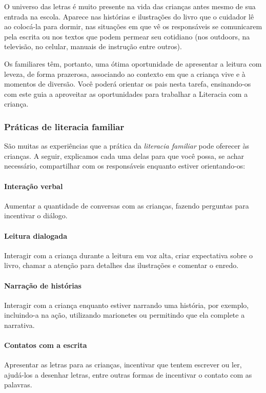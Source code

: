 \documentclass[11pt]{extarticle}
\begin{document}
O universo das letras é muito presente na vida das crianças antes mesmo de sua 
entrada na escola. Aparece nas histórias e ilustrações do livro que o cuidador 
lê ao colocá-la para dormir, nas situações em que vê os responsáveis se comunicarem 
pela escrita ou nos textos que podem permear seu cotidiano (nos outdoors, na 
televisão, no celular, manuais de instrução entre outros). 

Os familiares têm, 
portanto, uma ótima oportunidade de apresentar a leitura com leveza, de forma 
prazerosa, associando ao contexto em que a criança vive e à momentos de diversão. 
Você poderá orientar os pais nesta tarefa, ensinando-os com este guia a aproveitar 
as oportunidades para trabalhar a Literacia com a criança.

\subsubsection{Práticas de literacia familiar} 

São muitas as experiências que a prática da \textit{literacia familiar} 
pode oferecer às crianças. A seguir, explicamos cada uma delas para que você possa, 
se achar necessário, compartilhar com os responsáveis enquanto estiver orientando-os: 

\paragraph{Interação verbal} Aumentar a quantidade de conversas com as 
crianças, fazendo perguntas para incentivar o diálogo.

\paragraph{Leitura dialogada} Interagir com a criança durante a leitura 
em voz alta, criar expectativa sobre o livro, chamar a atenção para detalhes 
das ilustrações e comentar o enredo.

\paragraph{Narração de histórias} Interagir com a criança enquanto 
estiver narrando uma história, por exemplo, incluindo-a na ação, utilizando 
marionetes ou permitindo que ela complete a narrativa.

\paragraph{Contatos com a escrita} Apresentar as letras para as 
crianças, incentivar que tentem escrever ou ler, ajudá-los a desenhar letras, 
entre outras formas de incentivar o contato com as palavras.
\end{document}
